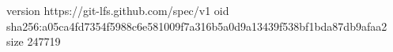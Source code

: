 version https://git-lfs.github.com/spec/v1
oid sha256:a05ca4fd7354f5988c6e581009f7a316b5a0d9a13439f538bf1bda87db9afaa2
size 247719
